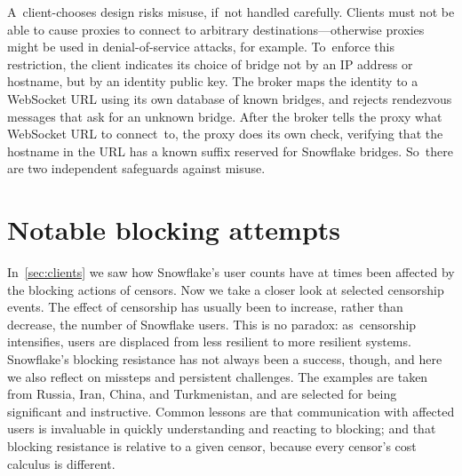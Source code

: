 \documentclass[letterpaper,twocolumn]{article}
\begin{document}
A~client-chooses design risks misuse, if~not handled carefully.
Clients must not be able to
cause proxies to connect to arbitrary destinations---otherwise
proxies might be used in denial-of-service attacks, for example.
To~enforce this restriction,
the client indicates its choice of bridge
not by an IP address or hostname,
but by an identity public key.
The broker maps the identity to a WebSocket URL
using its own database of known bridges,
and rejects rendezvous messages that ask for an unknown bridge.
After the broker tells the proxy what WebSocket URL to connect~to,
the proxy does its own check,
verifying that the hostname in the URL has
a known suffix reserved for Snowflake bridges.
So~there are two independent safeguards against misuse.


\section{Notable blocking attempts}
\label{sec:block}

In~\autoref{sec:clients} we saw how Snowflake's user counts
have at times been affected by the blocking actions of censors.
Now we take a closer look at selected censorship events.
The effect of censorship has usually been to increase, rather than decrease,
the number of Snowflake users.
This is no paradox:
as~censorship intensifies,
users are displaced from less resilient
to more resilient systems.
Snowflake's blocking resistance has not always been a success,
though, and here we also reflect on missteps
and persistent challenges.
The examples are taken from
Russia, Iran, China, and Turkmenistan,
and are selected for being significant and instructive.
Common lessons are that communication
with affected users is invaluable in quickly understanding and reacting to blocking;
and that blocking resistance is relative to a given censor,
because every censor's cost calculus is different.
\end{document}
